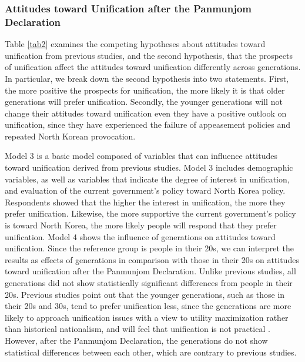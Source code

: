 \documentclass[letterpaper,9pt,twocolumn,twoside,]{pinp}
\begin{document}
\hypertarget{attitudes-toward-unification-after-the-panmunjom-declaration}{%
\subsubsection{Attitudes toward Unification after the Panmunjom
Declaration}\label{attitudes-toward-unification-after-the-panmunjom-declaration}}

Table \ref{tab2} examines the competing hypotheses about attitudes
toward unification from previous studies, and the second hypothesis,
that the prospects of unification affect the attitudes toward
unification differently across generations. In particular, we break down
the second hypothesis into two statements. First, the more positive the
prospects for unification, the more likely it is that older generations
will prefer unification. Secondly, the younger generations will not
change their attitudes toward unification even they have a positive
outlook on unification, since they have experienced the failure of
appeasement policies and repeated North Korean provocation.

Model 3 is a basic model composed of variables that can influence
attitudes toward unification derived from previous studies. Model 3
includes demographic variables, as well as variables that indicate the
degree of interest in unification, and evaluation of the current
government's policy toward North Korea policy. Respondents showed that
the higher the interest in unification, the more they prefer
unification. Likewise, the more supportive the current government's
policy is toward North Korea, the more likely people will respond that
they prefer unification. Model 4 shows the influence of generations on
attitudes toward unification. Since the reference group is people in
their 20s, we can interpret the results as effects of generations in
comparison with those in their 20s on attitudes toward unification after
the Panmunjom Declaration. Unlike previous studies, all generations did
not show statistically significant differences from people in their 20s.
Previous studies point out that the younger generations, such as those
in their 20s and 30s, tend to prefer unification less, since the
generations are more likely to approach unification issues with a view
to utility maximization rather than historical nationalism, and will
feel that unification is not practical \citep{ChoHan2014}. However,
after the Panmunjom Declaration, the generations do not show statistical
differences between each other, which are contrary to previous studies.
\end{document}
